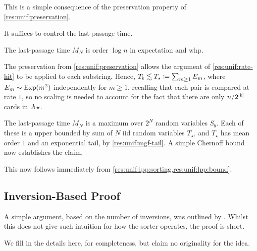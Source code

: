 \documentclass{article}
\begin{document}
\begin{Proof}
This is a simple consequence of the preservation property of \cref{res:unif:preservation}.
\end{Proof}

It suffices to control the last-passage time.

\begin{lem}
\label{res:unif:lpp:bound}
The last-passage time $M_N$ is order $\log n$ in expectation and whp.
\end{lem}

\begin{Proof}%
The preservation from \cref{res:unif:preservation} allows the argument of \cref{res:unif:rate-hit} to be applied to each substring.
Hence, $T_b \lesssim T_\star \coloneqq \sum_{m\ge1} E_m$, where $E_m \sim \operatorname{Exp}(m^2)$ independently for $m \ge 1$, recalling that each pair is compared at rate $1$, so no scaling is needed to account for the fact that there are only $n/2^{| b |}$ cards in $.b\star$.

The last-passage time $M_N$ is a maximum over $2^N$ random variables $S_b$.
Each of these is a upper bounded by sum of $N$ iid random variables $T_\star$, and $T_\star$ has mean order $1$ and an exponential tail, by \cref{res:unif:mgf-tail}.
A simple Chernoff bound now establishes the claim.
\end{Proof}

\begin{Proof}
This now follows immediately from \cref{res:unif:lpp:sorting,res:unif:lpp:bound}.
\end{Proof}


	


\subsection{Inversion-Based Proof}

\newcommand{\xx}{x}

A simple argument, based on the number of inversions, was outlined by \textcite{M:uniform-sort}.
Whilst this does not give such intuition for how the sorter operates, the proof is short.

We fill in the details here, for completeness, but claim no originality for the idea.
\end{document}
